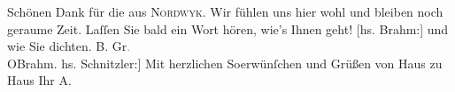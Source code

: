 \begin{ledgroupsized}[t]{13cm}
           \pstart
           {\pb}Schönen Dank für die \label{K_L03013-1v}\label{K_L03013-1h} aus \textsc{Nordwyk}. Wir fühlen uns hier wohl
               und bleiben noch geraume Zeit. Laſſen Sie bald ein Wort hören, wie’s Ihnen geht!
                  {[}hs. Brahm:{]} und wie Sie dichten.\pend
           \pstart
           B. Gr\textcolor{gray}{.}{\\}\spacefill\mbox{OBrahm.}\pend
           \pstart {[}hs. Schnitzler:{]} Mit herzlichen So{\geminationm}erwünſchen und Grüßen von Haus zu Haus Ihr \spacefill\mbox{A.}\pend{}\pstart
           \raggedleft{}\label{T_L03013-1v}\label{T_L03013-1h}\pend
           
         
         \endnumbering{}\end{ledgroupsized}  \newcommand{\dateiname}{L03013}\newcommand{\titel}{Arthur Schnitzler und Otto Brahm an Felix Salten, 19. 7. 1908}\newcommand{\editorInnen}{Martin Anton Müller und Laura Untner}
      